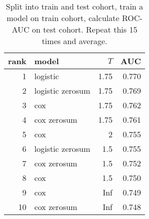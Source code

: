 \begin{table}[ht]
\centering
\begin{tabular}{rlrr}
  \hline
rank & model & $T$ & AUC \\ 
  \hline
   1 & logistic & 1.75 & 0.770 \\ 
     2 & logistic zerosum & 1.75 & 0.769 \\ 
     3 & cox & 1.75 & 0.762 \\ 
     4 & cox zerosum & 1.75 & 0.761 \\ 
     5 & cox & 2 & 0.755 \\ 
     6 & logistic zerosum & 1.5 & 0.755 \\ 
     7 & cox zerosum & 1.5 & 0.752 \\ 
     8 & cox & 1.5 & 0.750 \\ 
     9 & cox & Inf & 0.749 \\ 
    10 & cox zerosum & Inf & 0.748 \\ 
   \hline
\end{tabular}
\caption{Split into train and test cohort, train a model on train cohort, calculate ROC-AUC
        on test cohort. Repeat this 15 times and average.} 
\label{fig:top-auc-schmitz}
\end{table}

